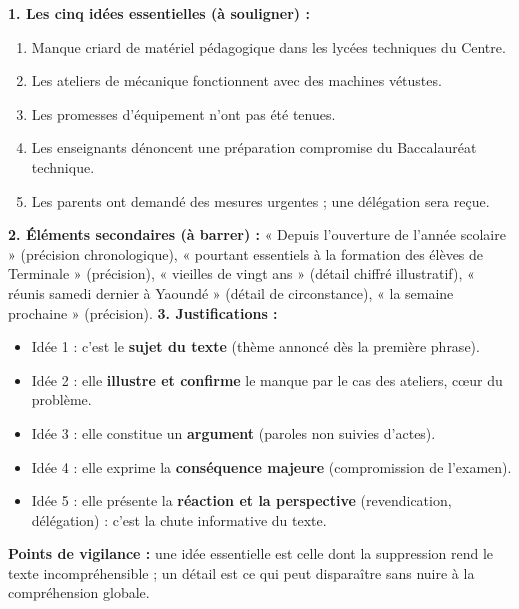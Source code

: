 \documentclass[11pt]{article}
\begin{document}
\begin{corrige}
\textbf{1. Les cinq idées essentielles (à souligner) :}
\begin{enumerate}
\item Manque criard de matériel pédagogique dans les lycées techniques du Centre.
\item Les ateliers de mécanique fonctionnent avec des machines vétustes.
\item Les promesses d'équipement n'ont pas été tenues.
\item Les enseignants dénoncent une préparation compromise du Baccalauréat technique.
\item Les parents ont demandé des mesures urgentes ; une délégation sera reçue.
\end{enumerate}
\textbf{2. Éléments secondaires (à barrer) :} « Depuis l'ouverture de l'année scolaire » (précision chronologique), « pourtant essentiels à la formation des élèves de Terminale » (précision), « vieilles de vingt ans » (détail chiffré illustratif), « réunis samedi dernier à Yaoundé » (détail de circonstance), « la semaine prochaine » (précision).
\textbf{3. Justifications :}
\begin{itemize}
\item Idée 1 : c'est le \textbf{sujet du texte} (thème annoncé dès la première phrase).
\item Idée 2 : elle \textbf{illustre et confirme} le manque par le cas des ateliers, cœur du problème.
\item Idée 3 : elle constitue un \textbf{argument} (paroles non suivies d'actes).
\item Idée 4 : elle exprime la \textbf{conséquence majeure} (compromission de l'examen).
\item Idée 5 : elle présente la \textbf{réaction et la perspective} (revendication, délégation) : c'est la chute informative du texte.
\end{itemize}
\textbf{Points de vigilance :} une idée essentielle est celle dont la suppression rend le texte incompréhensible ; un détail est ce qui peut disparaître sans nuire à la compréhension globale.
\end{corrige}
\end{document}
